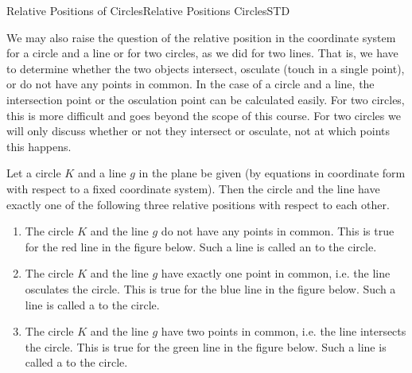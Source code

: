 \begin{MXContent}{Relative Positions of Circles}{Relative Positions Circles}{STD}

We may also raise the question of the relative position in the coordinate system for a circle and a line or for two circles, 
as we did for two lines. That is, we have to determine whether the two objects intersect, osculate (touch in a single point), or do not 
have any points in common. In the case of a circle and a line, the intersection point or the osculation point can be 
calculated easily. For two circles, this is more difficult and goes beyond the scope of this course. For two 
circles we will only discuss whether or not they intersect or osculate, not at which points this happens.

\begin{MInfo}
Let a circle $K$ and a line $g$ in the plane be given 
(by equations in coordinate form with respect to a fixed coordinate system). Then the circle and the line 
have exactly one of the following three relative positions with respect to each other.
\begin{enumerate}
 \item The circle $K$ and the line $g$ do not have any points in common. This is true for the red line in the figure below. 
  Such a line is called an  to the circle.
 \item The circle $K$ and the line $g$ have exactly one point in common, i.e. the line osculates the circle. 
  This is true for the blue line in the figure below. Such a line is called a  to the circle.
 \item The circle $K$ and the line $g$ have two points in common, i.e. the line intersects the circle. 
  This is true for the green line in the figure below. Such a line is called a  to the circle.
\end{enumerate}
\begin{center}
\end{center} 
\end{MInfo}


\end{MXContent}
